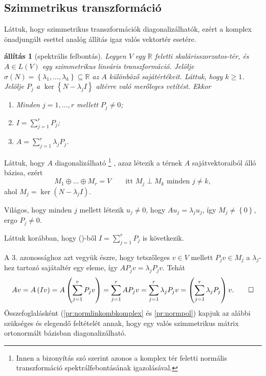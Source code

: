 \documentclass[9pt, a4paper, showtrims]{memoir}
\makeatletter
\renewenvironment{proof}[1][\proofname]
    {\par\pushQED{\qed}%
    \normalfont \topsep6\p@\@plus6\p@\relax
    \trivlist
    \item[\hskip\labelsep
        \itshape
    #1\@addpunct{:}]\ignorespaces}
    {\popQED\endtrivlist\@endpefalse}
\theoremstyle{plain}
\newtheorem{proposition}{állítás}[chapter]
\theoremstyle{remark}
\theoremstyle{definition}
\makeatother
\begin{document}
\subsection{Szimmetrikus transzformáció}
Láttuk, hogy szimmetrikus transzformációk diagonalizálhatók,
ezért a komplex önadjungált esettel analóg állítás igaz valós vektortér esetére.
\begin{proposition}[spektrális felbontás]
	Legyen $V$ egy $\mathbb{R}$ feletti skalárisszorzatos-tér, és $A\in L\left( V \right)$
	egy szimmetrikus lineáris transzformáció.
	Jelölje $\sigma\left( N \right)=\left\{\lambda_1,\ldots,\lambda_k  \right\}\subseteq\mathbb{R}$ az $A$ különböző sajátértékeit.
	Láttuk, hogy $k\geq 1$.
	Jelölje $P_j$ a $\ker\left\{ N-\lambda_jI \right\}$ altérre való merőleges vetítést.
	Ekkor
	\begin{enumerate}
		\item Minden $j=1,\ldots,r$ mellett $P_j\neq 0$;
		\item $I=\sum_{j=1}^rP_j$;
		\item $A=\sum_{j=1}^r\lambda_jP_j$.
		      \qedhere
	\end{enumerate}
\end{proposition}
\begin{proof}
	Láttuk, hogy $A$ diagonalizálható
	\footnote{Innen a bizonyítás szó szerint azonos a komplex tér feletti normális transzformáció spektrálfebontásának igazolásával.}%
	, azaz létezik a térnek $A$ sajátvektoraiból álló
	bázisa,
	ezért
	\[
		M_1\oplus\dots\oplus M_r=V
		\qquad\text{itt }M_j\perp M_k\text{ minden }j\neq k,\tag{\dag}
	\]
	ahol $M_j=\ker\left( N-\lambda_jI \right)$.

	Világos,
	hogy minden $j$ mellett létezik $u_j\neq 0$, hogy $Au_j=\lambda_ju_j$,
	így $M_j\neq \left\{ 0 \right\}$,
	ergo $P_j\neq 0.$

	Láttuk korábban, hogy (\dag)-ből $I=\sum_{j=1}^{r}P_j$ is következik.

	A 3. azonossághoz azt vegyük észre,
	hogy tetszőleges $v\in V$ mellett $P_jv\in M_j$ a $\lambda_j$-hez tartozó sajátaltér egy eleme,
	így $AP_jv=\lambda_jP_jv$. Tehát
	\[
		Av
		=
		A\left( Iv \right)
		=
		A\left( \sum_{j=1}^rP_jv \right)
		=
		\sum_{j=1}^rAP_jv
		=
		\sum_{j=1}^r\lambda_jP_jv
		=
		\left( \sum_{j=1}^r\lambda_jP_j \right)v.
		\qedhere
	\]
\end{proof}
Összefoglalásként (\ref{pr:normlinkombkomplex} és \ref{pr:normpol}) kapjuk az alábbi szükséges és elegendő feltételét annak,
hogy egy valós szimmetrikus mátrix ortonormált bázisban diagonalizálható.
\end{document}
